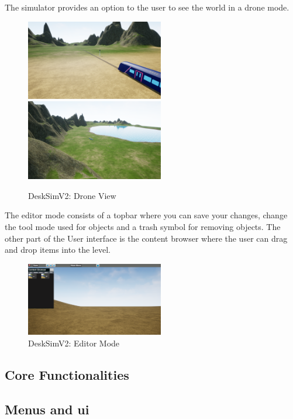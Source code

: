 The simulator provides an option to the user to see the world in a drone mode.
\bigskip
\begin{figure}[H]
    \centering
    \vspace{12pt}
    \includegraphics[width=6cm]{figures/DroneMode.PNG}
    \includegraphics[width=6cm]{figures/DroneMode2.PNG}
    \caption{DeskSimV2: Drone View}
    \label{Drone_Mode_img}
\end{figure} 
\bigskip \bigskip

The editor mode consists of a topbar where you can save your changes, change the tool mode used for objects and a trash symbol for removing objects. The other part of the User interface is the content browser where the user can drag and drop items into the level.
\bigskip
\begin{figure}[H]
    \centering
    \vspace{12pt}
    \includegraphics[width=6cm]{figures/Editor_Mode.PNG}
    \caption{DeskSimV2: Editor Mode}
    \label{Editor_Mode_img}
\end{figure} 

\subsection{Core Functionalities}

\subsection{Menus and ui}
